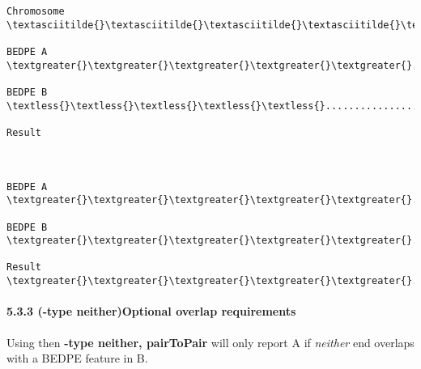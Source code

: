 \documentclass[letterpaper,10pt,english]{sphinxmanual}
\begin{document}
\begin{Verbatim}[commandchars=\\\{\}]
Chromosome  \textasciitilde{}\textasciitilde{}\textasciitilde{}\textasciitilde{}\textasciitilde{}\textasciitilde{}\textasciitilde{}\textasciitilde{}\textasciitilde{}\textasciitilde{}\textasciitilde{}\textasciitilde{}\textasciitilde{}\textasciitilde{}\textasciitilde{}\textasciitilde{}\textasciitilde{}\textasciitilde{}\textasciitilde{}\textasciitilde{}\textasciitilde{}\textasciitilde{}\textasciitilde{}\textasciitilde{}\textasciitilde{}\textasciitilde{}\textasciitilde{}\textasciitilde{}\textasciitilde{}\textasciitilde{}\textasciitilde{}\textasciitilde{}\textasciitilde{}\textasciitilde{}\textasciitilde{}\textasciitilde{}\textasciitilde{}\textasciitilde{}\textasciitilde{}\textasciitilde{}\textasciitilde{}\textasciitilde{}\textasciitilde{}\textasciitilde{}\textasciitilde{}\textasciitilde{}\textasciitilde{}\textasciitilde{}\textasciitilde{}\textasciitilde{}\textasciitilde{}\textasciitilde{}\textasciitilde{}\textasciitilde{}\textasciitilde{}\textasciitilde{}\textasciitilde{}\textasciitilde{}\textasciitilde{}\textasciitilde{}\textasciitilde{}\textasciitilde{}\textasciitilde{}\textasciitilde{}

BEDPE A         \textgreater{}\textgreater{}\textgreater{}\textgreater{}\textgreater{}.................................\textgreater{}\textgreater{}\textgreater{}\textgreater{}\textgreater{}

BEDPE B            \textless{}\textless{}\textless{}\textless{}\textless{}.............................\textgreater{}\textgreater{}\textgreater{}\textgreater{}\textgreater{}

Result



BEDPE A         \textgreater{}\textgreater{}\textgreater{}\textgreater{}\textgreater{}.................................\textgreater{}\textgreater{}\textgreater{}\textgreater{}\textgreater{}

BEDPE B            \textgreater{}\textgreater{}\textgreater{}\textgreater{}\textgreater{}.............................\textgreater{}\textgreater{}\textgreater{}\textgreater{}\textgreater{}

Result          \textgreater{}\textgreater{}\textgreater{}\textgreater{}\textgreater{}.................................\textgreater{}\textgreater{}\textgreater{}\textgreater{}\textgreater{}
\end{Verbatim}


\paragraph{5.3.3 (-type neither)Optional overlap requirements}
\label{content/pairToPair:type-neither-optional-overlap-requirements}
Using then \textbf{-type neither, pairToPair} will only report A if \emph{neither} end overlaps with a BEDPE
feature in B.
\end{document}
